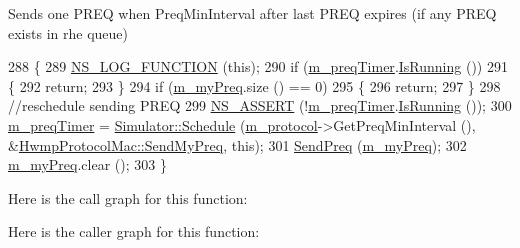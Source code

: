 Sends one P\+R\+EQ when Preq\+Min\+Interval after last P\+R\+EQ expires (if any P\+R\+EQ exists in rhe queue) 


\begin{DoxyCode}
288 \{
289   \hyperlink{log-macros-disabled_8h_a90b90d5bad1f39cb1b64923ea94c0761}{NS\_LOG\_FUNCTION} (\textcolor{keyword}{this});
290   \textcolor{keywordflow}{if} (\hyperlink{classns3_1_1dot11s_1_1HwmpProtocolMac_a8cdeebe6f35b7b3373c8ca9dd4c3c0cf}{m\_preqTimer}.\hyperlink{classns3_1_1EventId_aabf8476d1a080c199ea0c6aa9ccea372}{IsRunning} ())
291     \{
292       \textcolor{keywordflow}{return};
293     \}
294   \textcolor{keywordflow}{if} (\hyperlink{classns3_1_1dot11s_1_1HwmpProtocolMac_ab89814e2268f60ccf49c06423757b821}{m\_myPreq}.size () == 0)
295     \{
296       \textcolor{keywordflow}{return};
297     \}
298   \textcolor{comment}{//reschedule sending PREQ}
299   \hyperlink{assert_8h_a6dccdb0de9b252f60088ce281c49d052}{NS\_ASSERT} (!\hyperlink{classns3_1_1dot11s_1_1HwmpProtocolMac_a8cdeebe6f35b7b3373c8ca9dd4c3c0cf}{m\_preqTimer}.\hyperlink{classns3_1_1EventId_aabf8476d1a080c199ea0c6aa9ccea372}{IsRunning} ());
300   \hyperlink{classns3_1_1dot11s_1_1HwmpProtocolMac_a8cdeebe6f35b7b3373c8ca9dd4c3c0cf}{m\_preqTimer} = \hyperlink{classns3_1_1Simulator_a671882c894a08af4a5e91181bf1eec13}{Simulator::Schedule} (\hyperlink{classns3_1_1dot11s_1_1HwmpProtocolMac_a6a05e798e264c97e2b5c484a29270b7d}{m\_protocol}->GetPreqMinInterval
       (), &\hyperlink{classns3_1_1dot11s_1_1HwmpProtocolMac_a15742d45e557ccc5d3b7910bd86069aa}{HwmpProtocolMac::SendMyPreq}, \textcolor{keyword}{this});
301   \hyperlink{classns3_1_1dot11s_1_1HwmpProtocolMac_a21265cdf136b02d2974034c2ba9b8d4f}{SendPreq} (\hyperlink{classns3_1_1dot11s_1_1HwmpProtocolMac_ab89814e2268f60ccf49c06423757b821}{m\_myPreq});
302   \hyperlink{classns3_1_1dot11s_1_1HwmpProtocolMac_ab89814e2268f60ccf49c06423757b821}{m\_myPreq}.clear ();
303 \}
\end{DoxyCode}


Here is the call graph for this function\+:




Here is the caller graph for this function\+:


